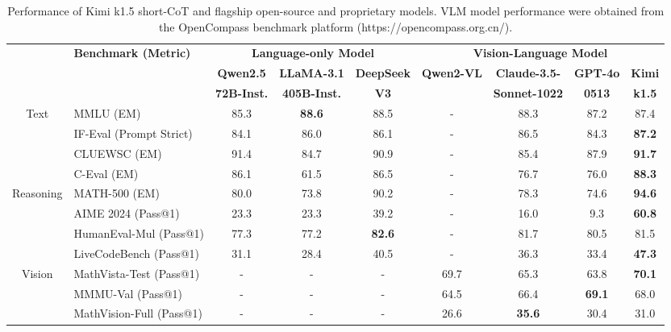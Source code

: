 \begin{table}[h]
    \centering
    \footnotesize
    \setlength{\tabcolsep}{2.5pt}
    \begin{tabular}{@{}c l | c c c | c c c  c@{}}
    \toprule
    & \multirow{3}{*}{\centering \textbf{Benchmark {\tiny (Metric)}}} 
    & \multicolumn{3}{c|}{\textbf{Language-only Model}} 
    & \multicolumn{4}{c}{\textbf{Vision-Language Model}} \\ 
    & & \textbf{Qwen2.5} & \textbf{LLaMA-3.1} & \textbf{DeepSeek} & \textbf{Qwen2-VL} & \textbf{Claude-3.5-} & \textbf{GPT-4o}  & \textbf{Kimi} \\
    & & \textbf{72B-Inst.} & \textbf{405B-Inst.} & \textbf{V3}  & & \textbf{Sonnet-1022} & \textbf{0513} & \textbf{k1.5} \\
    \midrule
    
    \multirow{4}{*}{Text}
    & MMLU {\tiny (EM)}   & 85.3 & \textbf{88.6} & 88.5 & - & 88.3 & 87.2 & 87.4 \\
    & IF-Eval {\tiny (Prompt Strict)}  & 84.1 & 86.0 & 86.1 & - & 86.5 & 84.3 & \textbf{87.2} \\
    & CLUEWSC  {\tiny (EM)} & 91.4 & 84.7 & 90.9 & - & 85.4 & 87.9 & \textbf{91.7} \\
    & C-Eval  {\tiny (EM)}  & 86.1 & 61.5 & 86.5 & - & 76.7 & 76.0 & \textbf{88.3} \\
    \midrule
    
    \multirow{4}{*}{Reasoning} 
    & MATH-500 {\tiny (EM)} & 80.0 & 73.8 & 90.2 & - & 78.3 & 74.6 & \textbf{94.6} \\
    & AIME 2024 {\tiny (Pass@1)} & 23.3 & 23.3 & 39.2 & - & 16.0 & 9.3 & \textbf{60.8} \\
    & HumanEval-Mul {\tiny (Pass@1)}  & 77.3 & 77.2 & \textbf{82.6} & - & 81.7 & 80.5 & 81.5 \\
    & LiveCodeBench {\tiny (Pass@1)} & 31.1 & 28.4 & 40.5 & - & 36.3 & 33.4 & \textbf{47.3} \\
    \midrule
    
    \multirow{3}{*}{Vision} 
    & MathVista-Test {\tiny (Pass@1)} & - & - & - & 69.7 & 65.3 & 63.8 & \textbf{70.1} \\
    & MMMU-Val {\tiny (Pass@1)} & - & - & - & 64.5 & 66.4 & \textbf{69.1} & 68.0 \\
    & MathVision-Full {\tiny (Pass@1)} & - & - & - & 26.6 & \textbf{35.6} & 30.4 & 31.0 \\
 
    \bottomrule
    \end{tabular}
    \vspace{1em}
    \caption{Performance of Kimi k1.5 short-CoT and flagship open-source and proprietary models. VLM model performance were obtained from the OpenCompass benchmark platform (https://opencompass.org.cn/).}
    \label{tab:short_perf}
\end{table}
